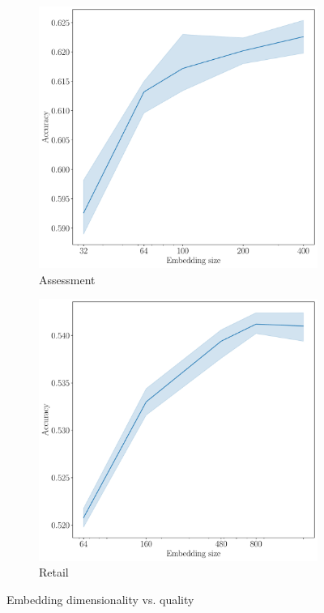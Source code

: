 \documentclass[sigconf]{acmart}
\begin{document}
\begin{figure}
\begin{subfigure}{0.25\linewidth}
  \end{subfigure}%
  \begin{subfigure}{0.25\linewidth}
    \caption{Assessment}
    \includegraphics[width=\linewidth]{figures/hidden_size_bowl2019.pdf}
  \end{subfigure}%
  \begin{subfigure}{0.25\linewidth}
    \caption{Retail}
    \includegraphics[width=\linewidth]{figures/hidden_size_x5.pdf}
  \end{subfigure}
  \caption{Embedding dimensionality vs. quality}
  \label{fig-emb-dim}
\end{figure}
\end{document}
